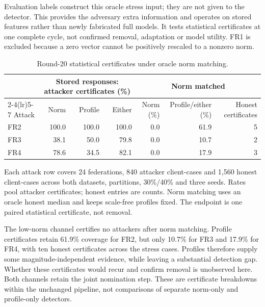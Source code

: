 \documentclass[journal]{IEEEtran}
\begin{document}
Evaluation labels construct this oracle stress input; they are not given
to the detector. This provides the adversary extra information and
operates on stored features rather than newly fabricated full models.
It tests statistical certificates at one complete cycle, not confirmed
removal, adaptation or model utility. FR1 is excluded because a zero
vector cannot be positively rescaled to a nonzero norm.

\begin{table}[t]\centering\footnotesize\setlength{\tabcolsep}{4pt}
\caption{Round-20 statistical certificates under oracle norm matching.}\label{tab:norm-matching}
\begin{tabular}{lrrrrrr}\toprule
& \multicolumn{3}{c}{Stored responses: attacker certificates (\%)} & \multicolumn{3}{c}{Norm matched} \\
\cmidrule(lr){2-4}\cmidrule(lr){5-7}
Attack & Norm & Profile & Either & Norm (\%) & Profile/either (\%) & Honest certificates \\ \midrule
FR2 & 100.0 & 100.0 & 100.0 & 0.0 & 61.9 & 5 \\
FR3 & 38.1 & 50.0 & 79.8 & 0.0 & 10.7 & 2 \\
FR4 & 78.6 & 34.5 & 82.1 & 0.0 & 17.9 & 3 \\
\bottomrule\end{tabular}
\par\smallskip\parbox{.96\textwidth}{\scriptsize Each attack row covers 24 federations, 840 attacker client-cases and 1,560 honest client-cases across both datasets, partitions, 30\%/40\% and three seeds. Rates pool attacker certificates; honest entries are counts. Norm matching uses an oracle honest median and keeps scale-free profiles fixed. The endpoint is one paired statistical certificate, not removal.}
\end{table}


The low-norm channel certifies no attackers after norm matching.
Profile certificates retain 61.9\% coverage for FR2, but only 10.7\%
for FR3 and 17.9\% for FR4, with ten honest certificates across the
stress cases. Profiles therefore supply some magnitude-independent
evidence, while leaving a substantial detection gap. Whether these
certificates would recur and confirm removal is unobserved here.
Both channels retain the joint nomination step. These are certificate
breakdowns within the unchanged pipeline, not comparisons of separate
norm-only and profile-only detectors.
\end{document}
